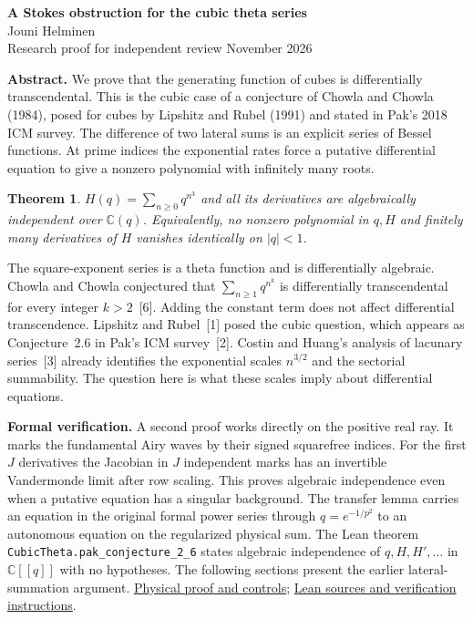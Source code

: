 \documentclass[11pt]{article}
\newcommand{\C}{\mathbb C}
\newtheorem*{thm}{Theorem}
\newcommand{\head}[1]{\par\medskip\noindent\textbf{#1}\quad}
\begin{document}
\begin{center}
{\Large\bfseries A Stokes obstruction for the cubic theta series}\\[6pt]
Jouni Helminen\\[4pt]
{\small Research proof for independent review  November 2026}
\end{center}
\noindent\textbf{Abstract.} We prove that the generating function of cubes is differentially transcendental. This is the cubic case of a conjecture of Chowla and Chowla (1984), posed for cubes by Lipshitz and Rubel (1991) and stated in Pak's 2018 ICM survey. The difference of two lateral sums is an explicit series of Bessel functions. At prime indices the exponential rates force a putative differential equation to give a nonzero polynomial with infinitely many roots.

\begin{thm}
$H(q)=\sum_{n\geq 0}q^{n^3}$ and all its derivatives are algebraically independent over $\C(q)$. Equivalently, no nonzero polynomial in $q,H$ and finitely many derivatives of $H$ vanishes identically on $|q|<1$.
\end{thm}
The square-exponent series is a theta function and is differentially algebraic. Chowla and Chowla conjectured that $\sum_{n\ge1}q^{n^k}$ is differentially transcendental for every integer $k>2$~[6]. Adding the constant term does not affect differential transcendence. Lipshitz and Rubel~[1] posed the cubic question, which appears as Conjecture~2.6 in Pak's ICM survey~[2]. Costin and Huang's analysis of lacunary series~[3] already identifies the exponential scales $n^{3/2}$ and the sectorial summability. The question here is what these scales imply about differential equations.

\head{Formal verification.}
A second proof works directly on the positive real ray. It marks the fundamental Airy waves by their signed squarefree indices. For the first $J$ derivatives the Jacobian in $J$ independent marks has an invertible Vandermonde limit after row scaling. This proves algebraic independence even when a putative equation has a singular background. The transfer lemma carries an equation in the original formal power series through $q=e^{-1/p^2}$ to an autonomous equation on the regularized physical sum. The Lean theorem \texttt{CubicTheta.pak\_conjecture\_2\_6} states algebraic independence of $q,H,H',\ldots$ in $\C[[q]]$ with no hypotheses. The following sections present the earlier lateral-summation argument.
\href{https://github.com/jounih/pak-cubic-theta/blob/v1.0.1/paper/marked-wave-proof.md}{Physical proof and controls};
\href{https://github.com/jounih/pak-cubic-theta/blob/v1.0.1/LEAN_GUIDE.md}{Lean sources and verification instructions}.
\end{document}
